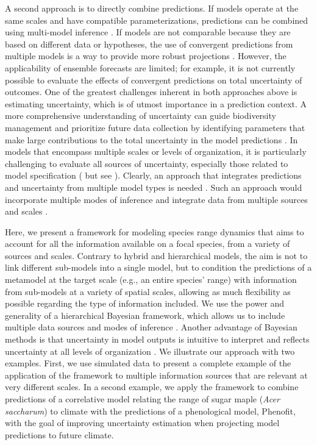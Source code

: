 \documentclass[11pt]{article}
\begin{document}
A second approach is to directly combine predictions.
If models operate at the same scales and have compatible parameterizations, predictions can be combined using multi-model inference \citep[e.g., model averaging, ensemble forecasting;][]{Thuiller2004, Araujo2007}. 
If models are not comparable because they are based on different data or hypotheses, the use of convergent predictions from multiple models is a way to provide more robust projections \citep{Morin2009, Marmion2009, Serra-Diaz2013}.
However, the applicability of ensemble forecasts are limited; for example, it is not currently possible to evaluate the effects of convergent predictions on total uncertainty of outcomes.
One of the greatest challenges inherent in both approaches above is estimating uncertainty, which is of utmost importance in a prediction context.
A more comprehensive understanding of uncertainty can guide biodiversity management and prioritize future data collection by identifying parameters that make large contributions to the total uncertainty in the model predictions \citep{McMahon2011}. 
In models that encompass multiple scales or levels of organization, it is particularly challenging to evaluate all sources of uncertainty, especially those related to model specification (\citealt{Calder2003} but see \citealt{Conlisk2013}).
Clearly, an approach that integrates predictions and uncertainty from multiple model types is needed \citep{Beck2012, Thuiller2013}. 
Such an approach would incorporate multiple modes of inference and integrate data from multiple sources and scales \citep{Levin1992, Peters2004, Thuiller2013}.

Here, we present a framework for modeling species range dynamics that aims to account for all the information available on a focal species, from a variety of sources and scales.
Contrary to hybrid and hierarchical models, the aim is not to link different sub-models into a single model, but to condition the predictions of a metamodel at the target scale (e.g., an entire species' range) with information from sub-models at a variety of spatial scales, allowing as much flexibility as possible regarding the type of information included. 
We use the power and generality of a hierarchical Bayesian framework, which allows us to include multiple data sources and modes of inference \citep{VanOijen2005, Clark2006, Hobbs2011, Hartig2012}. 
Another advantage of Bayesian methods is that uncertainty in model outputs is intuitive to interpret and reflects uncertainty at all levels of organization \citep{Cressie2009, Hobbs2011}. 
We illustrate our approach with two examples.
First, we use simulated data to present a complete example of the application of the framework to multiple information sources that are relevant at very different scales.
In a second example, we apply the framework to combine predictions of a correlative model relating the range of sugar maple (\emph{Acer saccharum}) to climate with the predictions of a phenological model, Phenofit, with the goal of improving uncertainty estimation when projecting model predictions to future climate.
\end{document}
